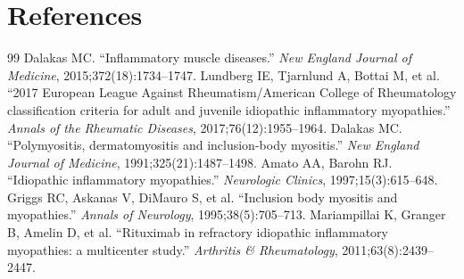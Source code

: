 \section*{References}
\begin{thebibliography}{99}
 Dalakas MC. ``Inflammatory muscle diseases.'' \textit{New England Journal of Medicine}, 2015;372(18):1734--1747.
 Lundberg IE, Tjarnlund A, Bottai M, et al. ``2017 European League Against Rheumatism/American College of Rheumatology classification criteria for adult and juvenile idiopathic inflammatory myopathies.'' \textit{Annals of the Rheumatic Diseases}, 2017;76(12):1955--1964.
 Dalakas MC. ``Polymyositis, dermatomyositis and inclusion-body myositis.'' \textit{New England Journal of Medicine}, 1991;325(21):1487--1498.
 Amato AA, Barohn RJ. ``Idiopathic inflammatory myopathies.'' \textit{Neurologic Clinics}, 1997;15(3):615--648.
 Griggs RC, Askanas V, DiMauro S, et al. ``Inclusion body myositis and myopathies.'' \textit{Annals of Neurology}, 1995;38(5):705--713.
 Mariampillai K, Granger B, Amelin D, et al. ``Rituximab in refractory idiopathic inflammatory myopathies: a multicenter study.'' \textit{Arthritis \& Rheumatology}, 2011;63(8):2439--2447.

\end{thebibliography}

